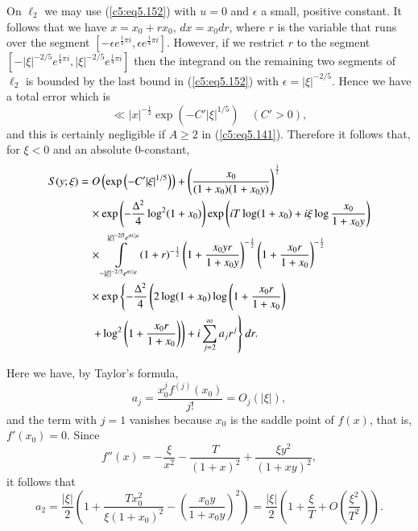 On $\ell_2$ we may use (\ref{c5:eq5.152}) with $u=0$ and $\epsilon $ a
small, positive constant. It follows that we have $x = x_0 + rx_0$,
$dx = x_0 dr$, where $r$ is the variable that runs over the segment
$\left[-\epsilon e^{\frac{1}{4} \pi i}, \epsilon e^{\frac{1}{4} \pi i}
  \right]$. However, if we restrict $r$ to the segment $[-|\xi|^{-2/5}
  e^{\frac{1}{4} \pi i}, |\xi|^{-2/5} e^{\frac{1}{4} \pi i}]$ then the
integrand on the remaining two segments of $\ell_2$ is bounded by the
last bound in (\ref{c5:eq5.152}) with $\epsilon = |\xi|^{-2/5}$. Hence
we have a total error which is 
\begin{equation}
\ll |x|^{-\frac{1}{2}} \exp \left(-C'|\xi|^{1/5}\right) \quad (C' >
0),\label{c5:eq5.153} 
\end{equation}
and this is certainly negligible if $A \geq 2$ in
(\ref{c5:eq5.141}). Therefore it follows that, for $\xi < 0$ and an
absolute 0-constant, 
{\fontsize{10pt}{12pt}\selectfont
\begin{align}
S(y;\xi) & = O\left(\exp \left(-C'|\xi|^{1/5}\right)\right) + 
\left(\frac{x_0}{(1+x_0) (1+x_0 y)} \right)^{\frac{1}{2}}\notag\\
& \quad \times \exp \left(-\frac{\Delta^2}{4} \log^2 (1+x_0) \right)
\exp \left(iT \log (1+x_0) + i \xi \log \frac{x_0}{1+x_0y}
\right)\notag\\  
& \quad \times\int\limits^{|\xi|^{-2|5} e^{\pi i /
    \mu}}_{-|\xi|^{-2/5} e^{\pi i /\mu}} (1+r)^{-\frac{1}{2}} \left(1+
\frac{x_0 yr}{1+x_0y} \right)^{-\frac{1}{2}} \left(1+\frac{x_0
  r}{1+x_0} \right)^{-\frac{1}{2}}\notag\\ 
& \quad \times\exp \left\{ -\frac{\Delta^2}{4} \left(2\log (1+x_0)
\log \left(1+\frac{x_0r}{1+x_0} \right)\right.\right. \notag\\ 
& \quad \left. \left. + \log^2 \left(1+\frac{x_0r}{1+x_0} \right)
\right)  + i \sum\limits^\infty_{j=2} a_j r^j\right\} dr .
\label{c5:eq5.154}
\end{align}}

Here we have, by Taylor's formula,
$$
a_j = \frac{x_0^j f^{(j)} (x_0)}{j!} = O_j (|\xi|), 
$$\pageoriginale
and the term with $j=1$ vanishes because $x_0$ is the saddle point of
$f(x)$, that is, $f'(x_0) = 0$. Since 
$$
f''(x) = - \frac{\xi}{x^2} - \frac{T}{(1+x)^2} + \frac{\xi
  y^2}{(1+xy)^2},  
$$
it follows that
$$ 
a_2 = \frac{|\xi|}{2} \left( 1+ \frac{Tx^2_0}{\xi (1+x_0)^2} -
\left(\frac{x_0 y}{1+x_0y} \right)^2 \right) = \frac{|\xi|}{2} \left(
1+ \frac{\xi}{T} + O \left( \frac{\xi^2}{T^2}\right)\right). 
$$

